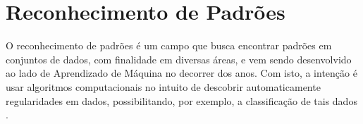 






\section{Reconhecimento de Padrões}
\label{sec:patternrec}
O reconhecimento de padrões é um campo que busca encontrar padrões em conjuntos de dados, com finalidade em diversas áreas, e vem sendo desenvolvido ao lado de Aprendizado de Máquina no decorrer dos anos. Com isto, a intenção é usar algoritmos computacionais no intuito de descobrir automaticamente regularidades em dados, possibilitando, por exemplo, a classificação de tais dados \cite{bishop:2006}.

